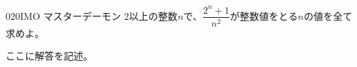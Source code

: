 \begin{thm}{020}{}{IMO マスターデーモン}
 2以上の整数$n$で、$\dfrac{2^n+1}{n^2}$が整数値をとる$n$の値を全て求めよ。 \\
\end{thm}

ここに解答を記述。